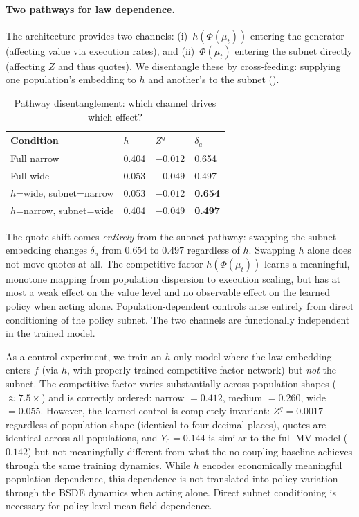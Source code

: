 \documentclass[11pt,a4paper]{article}
\newcommand{\mup}{\mu_t}
\begin{document}
\paragraph{Two pathways for law dependence.}\label{sec:pathway}
The architecture provides two channels: (i)~$h(\Phi(\mup))$ entering the generator (affecting value via execution rates), and (ii)~$\Phi(\mup)$ entering the subnet directly (affecting $Z$ and thus quotes). We disentangle these by cross-feeding: supplying one population's embedding to $h$ and another's to the subnet ().

\begin{table}[!htb]
\centering
\caption{Pathway disentanglement: which channel drives which effect?}
\label{tab:disentangle}
\begin{tabular}{@{}llll@{}}
\toprule
Condition & $h$ & $Z^q$ & $\delta_a$ \\
\midrule
Full narrow & 0.404 & $-0.012$ & 0.654 \\
Full wide & 0.053 & $-0.049$ & 0.497 \\
$h$=wide, subnet=narrow & 0.053 & $-0.012$ & \textbf{0.654} \\
$h$=narrow, subnet=wide & 0.404 & $-0.049$ & \textbf{0.497} \\
\bottomrule
\end{tabular}
\end{table}

The quote shift comes \emph{entirely} from the subnet pathway: swapping the subnet embedding changes $\delta_a$ from $0.654$ to $0.497$ regardless of $h$. Swapping $h$ alone does not move quotes at all. The competitive factor $h(\Phi(\mup))$ learns a meaningful, monotone mapping from population dispersion to execution scaling, but has at most a weak effect on the value level and no observable effect on the learned policy when acting alone. Population-dependent controls arise entirely from direct conditioning of the policy subnet. The two channels are functionally independent in the trained model.

As a control experiment, we train an $h$-only model where the law embedding enters $f$ (via $h$, with properly trained competitive factor network) but \emph{not} the subnet. The competitive factor varies substantially across population shapes ($\approx 7.5\times$) and is correctly ordered: narrow $= 0.412$, medium $= 0.260$, wide $= 0.055$. However, the learned control is completely invariant: $Z^q = 0.0017$ regardless of population shape (identical to four decimal places), quotes are identical across all populations, and $Y_0 = 0.144$ is similar to the full MV model ($0.142$) but not meaningfully different from what the no-coupling baseline achieves through the same training dynamics. While $h$ encodes economically meaningful population dependence, this dependence is not translated into policy variation through the BSDE dynamics when acting alone. Direct subnet conditioning is necessary for policy-level mean-field dependence.
\end{document}
